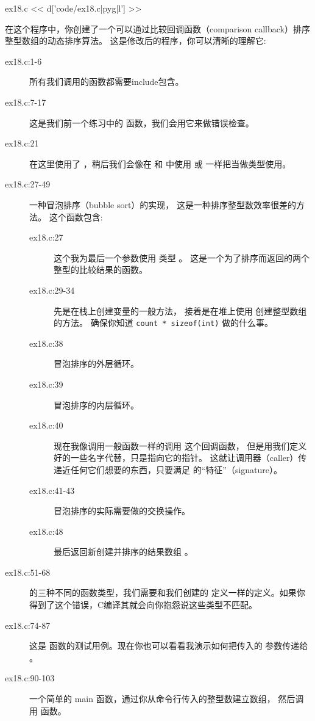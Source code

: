 \begin{code}{ex18.c}
<< d['code/ex18.c|pyg|l'] >>
\end{code}

在这个程序中，你创建了一个可以通过比较回调函数（comparison callback）排序整型数组的动态排序算法。 这是修改后的程序，你可以清晰的理解它:

\begin{description}
\item[ex18.c:1-6] 所有我们调用的函数都需要include包含。
\item[ex18.c:7-17] 这是我们前一个练习中的  函数，我们会用它来做错误检查。
\item[ex18.c:21] 在这里使用了 ，稍后我们会像在  和  中使用  或  一样把当做类型使用。
\item[ex18.c:27-49] 一种冒泡排序（bubble sort）的实现， 这是一种排序整型数效率很差的方法。 这个函数包含:
    \begin{description}
    \item[ex18.c:27] 这个我为最后一个参数使用  类型 。 这是一个为了排序而返回的两个整型的比较结果的函数。
    \item[ex18.c:29-34] 先是在栈上创建变量的一般方法， 接着是在堆上使用  创建整型数组的方法。 确保你知道 \verb|count * sizeof(int)| 做的什么事。
    \item[ex18.c:38] 冒泡排序的外层循环。
    \item[ex18.c:39] 冒泡排序的内层循环。
    \item[ex18.c:40] 现在我像调用一般函数一样的调用  这个回调函数， 但是用我们定义好的一些名字代替，只是指向它的指针。 这就让调用器（caller）传递近任何它们想要的东西，只要满足 的“特征”（signature）。
    \item[ex18.c:41-43] 冒泡排序的实际需要做的交换操作。
    \item[ex18.c:48] 最后返回新创建并排序的结果数组 。
    \end{description}
\item[ex18.c:51-68]  的三种不同的函数类型，我们需要和我们创建的  定义一样的定义。如果你得到了这个错误，C编译其就会向你抱怨说这些类型不匹配。
\item[ex18.c:74-87] 这是 函数的测试用例。现在你也可以看看我演示如何把传入的  参数传递给 。
\item[ex18.c:90-103] 一个简单的 main 函数，通过你从命令行传入的整型数建立数组， 然后调用  函数。

\end{description}
